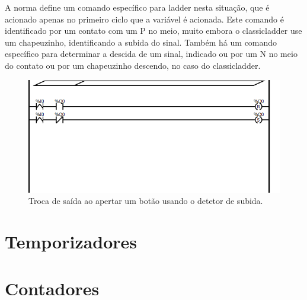 A norma define um comando específico para ladder nesta situação, que é acionado apenas no primeiro ciclo que a variável é acionada. Este comando é identificado por um contato com um P no meio, muito embora o classicladder use um chapeuzinho, identificando a subida do sinal. Também há um comando específico para determinar a descida de um sinal, indicado ou por um N no meio do contato ou por um chapeuzinho descendo, no caso do classicladder.

\begin{figure}[hbt]
	\centering
	\includegraphics[width=\textwidth]{figuras/pulso2}
	\caption{Troca de saída ao apertar um botão usando o detetor de subida.}
	\label{fig:ladder_pulso2}
\end{figure}

\section{Temporizadores}

\section{Contadores}
